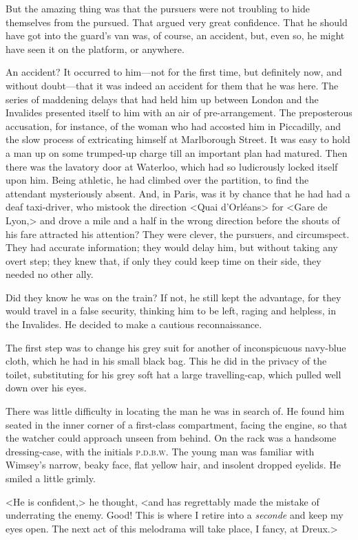 But the amazing thing was that the pursuers were not troubling to hide themselves from the pursued. That argued very great confidence. That he should have got into the guard's van was, of course, an accident, but, even so, he might have seen it on the platform, or anywhere.

An accident? It occurred to him—not for the first time, but definitely now, and without doubt—that it was indeed an accident for them that he was here. The series of maddening delays that had held him up between London and the Invalides presented itself to him with an air of pre-arrangement. The preposterous accusation, for instance, of the woman who had accosted him in Piccadilly, and the slow process of extricating himself at Marlborough Street. It was easy to hold a man up on some trumped-up charge till an important plan had matured. Then there was the lavatory door at Waterloo, which had so ludicrously locked itself upon him. Being athletic, he had climbed over the partition, to find the attendant mysteriously absent. And, in Paris, was it by chance that he had had a deaf taxi-driver, who mistook the direction <Quai d'Orléans> for <Gare de Lyon,> and drove a mile and a half in the wrong direction before the shouts of his fare attracted his attention? They were clever, the pursuers, and circumspect. They had accurate information; they would delay him, but without taking any overt step; they knew that, if only they could keep time on their side, they needed no other ally.

Did they know he was on the train? If not, he still kept the advantage, for they would travel in a false security, thinking him to be left, raging and helpless, in the Invalides. He decided to make a cautious reconnaissance.

The first step was to change his grey suit for another of inconspicuous navy-blue cloth, which he had in his small black bag. This he did in the privacy of the toilet, substituting for his grey soft hat a large travelling-cap, which pulled well down over his eyes.

There was little difficulty in locating the man he was in search of. He found him seated in the inner corner of a first-class compartment, facing the engine, so that the watcher could approach unseen from behind. On the rack was a handsome dressing-case, with the initials \textsc{p.d.b.w.} The young man was familiar with Wimsey's narrow, beaky face, flat yellow hair, and insolent dropped eyelids. He smiled a little grimly.

<He is confident,> he thought, <and has regrettably made the mistake of underrating the enemy. Good! This is where I retire into a \textit{seconde} and keep my eyes open. The next act of this melodrama will take place, I fancy, at Dreux.>

